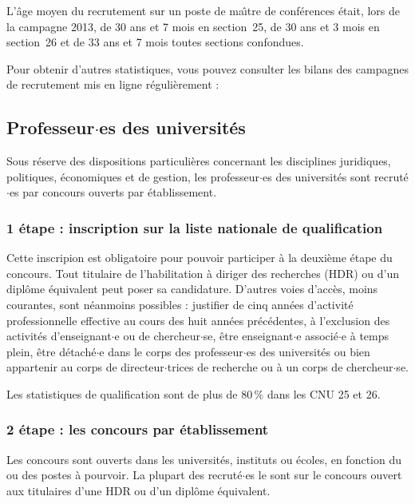 L'\^age moyen du recrutement sur un poste de ma\^\i  tre de
conf\'erences \'etait, lors de la campagne 2013, 
de 30 ans et 7 mois en section~25, 
de 30 ans et 3 mois en section~26 et 
de 33 ans et 7 mois toutes sections confondues.

Pour obtenir d'autres statistiques, vous pouvez consulter les bilans des
campagnes de recrutement mis en ligne r\'e\-gu\-li\`erement :
{}

\subsection{Professeur$\cdot$es des universit\'es}
Sous r\'eserve des dispositions particuli\`eres concernant les disciplines juridiques, politiques,
\'economiques et de gestion, les professeur$\cdot$es des universit\'es sont recrut\'e$\cdot$es par concours ouverts par \'etablissement.

\subsubsection*{1\iere{} \'etape : inscription sur la liste nationale de qualification}

Cette inscripion est obligatoire pour pouvoir participer \`a la deuxi\`eme \'etape du concours.
Tout titulaire de l'habilitation \`a diriger des recherches (HDR)
ou d'un dipl\^ome \'equivalent peut poser sa candidature.
D'autres voies d'acc\`es, moins courantes, sont n\'eanmoins possibles :
justifier de cinq ann\'ees d'activit\'e professionnelle effective au cours des huit ann\'ees pr\'ec\'edentes,
\`a l'exclusion des activit\'es d'enseignant$\cdot$e ou de chercheur$\cdot$se,
\^etre enseignant$\cdot$e associ\'e$\cdot$e \`a temps plein,
\^etre d\'etach\'e$\cdot$e dans le corps des professeur$\cdot$es des universit\'es
ou bien appartenir au corps de directeur$\cdot$trices de recherche ou \`a un corps de chercheur$\cdot$se.

Les statistiques de qualification sont de plus de 80\,\% dans les CNU 25 et 26.

\subsubsection*{2\ieme{} \'etape : les concours par \'etablissement}

Les concours sont ouverts dans les universit\'es, instituts ou \'ecoles, en fonction du ou des postes \`a pourvoir.
La plupart des recrut\'e$\cdot$es le sont sur le concours ouvert aux titulaires d'une HDR ou d'un dipl\^ome \'equivalent.

